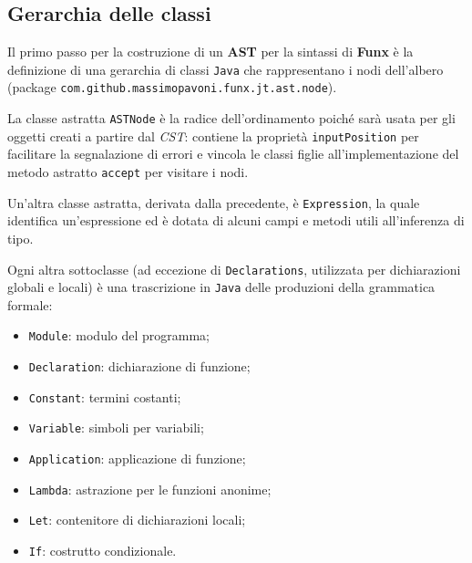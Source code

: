 \subsection{Gerarchia delle classi}
\label{sec:5-5-class-hierarchy}

Il primo passo per la costruzione di un \textbf{AST} per la sintassi di \textbf{Funx} è la definizione
di una gerarchia di classi \texttt{Java} che rappresentano i nodi dell'albero
(package \texttt{com.github.massimopavoni.funx.jt.ast.node}).


La classe astratta \texttt{ASTNode} è la radice dell'ordinamento poiché sarà usata per gli oggetti creati
a partire dal \textit{CST}: contiene la proprietà \texttt{inputPosition} per facilitare la segnalazione di errori
e vincola le classi figlie all'implementazione del metodo astratto \texttt{accept} per visitare i nodi.

\noindent Un'altra classe astratta, derivata dalla precedente, è \texttt{Expression}, la quale identifica
un'espressione ed è dotata di alcuni campi e metodi utili all'inferenza di tipo.


Ogni altra sottoclasse (ad eccezione di \texttt{Declarations}, utilizzata per dichiarazioni globali e locali)
è una trascrizione in \texttt{Java} delle produzioni della grammatica formale:
\begin{itemize}
    \item \texttt{Module}: modulo del programma;
    \item \texttt{Declaration}: dichiarazione di funzione;
    \item \texttt{Constant}: termini costanti;
    \item \texttt{Variable}: simboli per variabili;
    \item \texttt{Application}: applicazione di funzione;
    \item \texttt{Lambda}: astrazione per le funzioni anonime;
    \item \texttt{Let}: contenitore di dichiarazioni locali;
    \item \texttt{If}: costrutto condizionale.
\end{itemize}

\newpage

